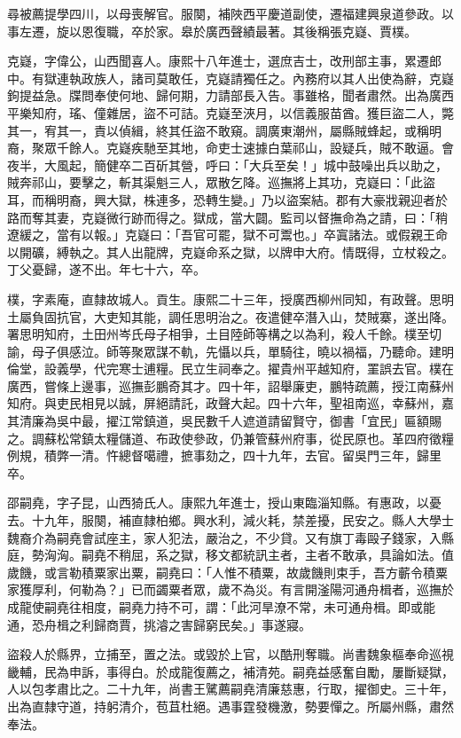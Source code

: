 \begin{pinyinscope}
尋被薦提學四川，以母喪解官。服闋，補陜西平慶道副使，遷福建興泉道參政。以事左遷，旋以恩復職，卒於家。皋於廣西聲績最著。其後稱張克嶷、賈樸。

克嶷，字偉公，山西聞喜人。康熙十八年進士，選庶吉士，改刑部主事，累遷郎中。有獄連執政族人，諸司莫敢任，克嶷請獨任之。內務府以其人出使為辭，克嶷鉤提益急。牒問奉使何地、歸何期，力請部長入告。事雖格，聞者肅然。出為廣西平樂知府，瑤、僮雜居，盜不可詰。克嶷至浹月，以信義服苗酋。獲巨盜二人，斃其一，宥其一，責以偵緝，終其任盜不敢窺。調廣東潮州，屬縣賊蜂起，或稱明裔，聚眾千餘人。克嶷疾馳至其地，命吏士速據白葉祁山，設疑兵，賊不敢逼。會夜半，大風起，簡健卒二百斫其營，呼曰：「大兵至矣！」城中鼓噪出兵以助之，賊奔祁山，要擊之，斬其渠魁三人，眾散乞降。巡撫將上其功，克嶷曰：「此盜耳，而稱明裔，興大獄，株連多，恐轉生變。」乃以盜案結。郡有大豪戕親迎者於路而奪其妻，克嶷微行跡而得之。獄成，當大闢。監司以督撫命為之請，曰：「稍遼緩之，當有以報。」克嶷曰：「吾官可罷，獄不可鬻也。」卒寘諸法。或假親王命以開礦，縛執之。其人出龍牌，克嶷命系之獄，以牌申大府。情既得，立杖殺之。丁父憂歸，遂不出。年七十六，卒。

樸，字素庵，直隸故城人。貢生。康熙二十三年，授廣西柳州同知，有政聲。思明土屬負固抗官，大吏知其能，調任思明治之。夜遣健卒潛入山，焚賊寨，遂出降。署思明知府，土田州岑氏母子相爭，土目陸師等構之以為利，殺人千餘。樸至切諭，母子俱感泣。師等聚眾謀不軌，先懾以兵，單騎往，曉以禍福，乃聽命。建明倫堂，設義學，代完寒士逋糧。民立生祠奉之。擢貴州平越知府，罣誤去官。樸在廣西，嘗條上邊事，巡撫彭鵬奇其才。四十年，詔舉廉吏，鵬特疏薦，授江南蘇州知府。與吏民相見以誠，屏絕請託，政聲大起。四十六年，聖祖南巡，幸蘇州，嘉其清廉為吳中最，擢江常鎮道，吳民數千人遮道請留賢守，御書「宜民」匾額賜之。調蘇松常鎮太糧儲道、布政使參政，仍兼管蘇州府事，從民原也。革四府徵糧例規，積弊一清。忤總督噶禮，摭事劾之，四十九年，去官。留吳門三年，歸里卒。

邵嗣堯，字子昆，山西猗氏人。康熙九年進士，授山東臨淄知縣。有惠政，以憂去。十九年，服闋，補直隸柏鄉。興水利，減火耗，禁差擾，民安之。縣人大學士魏裔介為嗣堯會試座主，家人犯法，嚴治之，不少貸。又有旗丁毒毆子錢家，入縣庭，勢洶洶。嗣堯不稍屈，系之獄，移文都統訊主者，主者不敢承，具論如法。值歲饑，或言勒積粟家出粟，嗣堯曰：「人惟不積粟，故歲饑則束手，吾方蘄令積粟家獲厚利，何勒為？」已而蠲粟者眾，歲不為災。有言開滏陽河通舟楫者，巡撫於成龍使嗣堯往相度，嗣堯力持不可，謂：「此河旱潦不常，未可通舟楫。即或能通，恐舟楫之利歸商賈，挑濬之害歸窮民矣。」事遂寢。

盜殺人於縣界，立捕至，置之法。或毀於上官，以酷刑奪職。尚書魏象樞奉命巡視畿輔，民為申訴，事得白。於成龍復薦之，補清苑。嗣堯益感奮自勵，屢斷疑獄，人以包孝肅比之。二十九年，尚書王騭薦嗣堯清廉慈惠，行取，擢御史。三十年，出為直隸守道，持躬清介，苞苴杜絕。遇事霆發機激，勢要憚之。所屬州縣，肅然奉法。


\end{pinyinscope}
